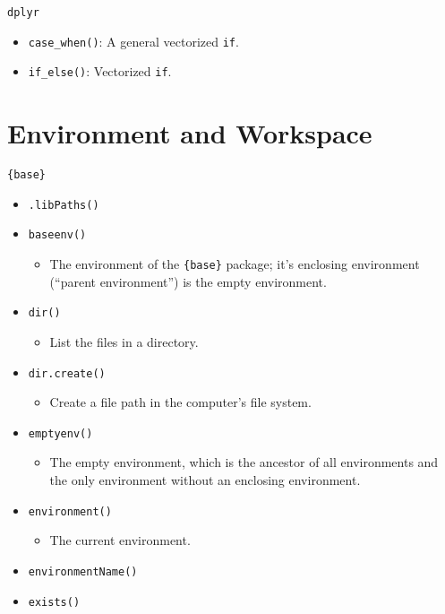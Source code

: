 \documentclass[
]{book}
\providecommand{\tightlist}{%
  \setlength{\itemsep}{0pt}\setlength{\parskip}{0pt}}
\begin{document}
\texttt{dplyr}

\begin{itemize}
\tightlist
\item
  \texttt{case\_when()}: A general vectorized \texttt{if}.
\item
  \texttt{if\_else()}: Vectorized \texttt{if}.
\end{itemize}

\hypertarget{environment-and-workspace}{%
\section{Environment and Workspace}\label{environment-and-workspace}}

\texttt{\{base\}}

\begin{itemize}
\tightlist
\item
  \texttt{.libPaths()}
\item
  \texttt{baseenv()}

  \begin{itemize}
  \tightlist
  \item
    The environment of the \texttt{\{base\}} package; it's enclosing environment (``parent environment'') is the empty environment.
  \end{itemize}
\item
  \texttt{dir()}

  \begin{itemize}
  \tightlist
  \item
    List the files in a directory.
  \end{itemize}
\item
  \texttt{dir.create()}

  \begin{itemize}
  \tightlist
  \item
    Create a file path in the computer's file system.
  \end{itemize}
\item
  \texttt{emptyenv()}

  \begin{itemize}
  \tightlist
  \item
    The empty environment, which is the ancestor of all environments and the only environment without an enclosing environment.
  \end{itemize}
\item
  \texttt{environment()}

  \begin{itemize}
  \tightlist
  \item
    The current environment.
  \end{itemize}
\item
  \texttt{environmentName()}
\item
  \texttt{exists()}


\end{itemize}
\end{document}
